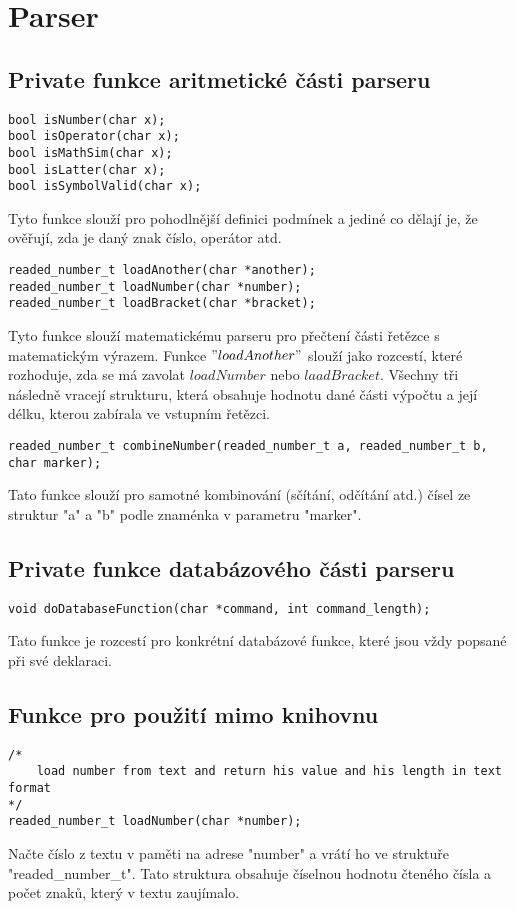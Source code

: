 
\section{Parser} 
\subsection{Private funkce aritmetické části parseru}
\begin{lstlisting}[style=CStyle]
bool isNumber(char x);     
bool isOperator(char x);   
bool isMathSim(char x);    
bool isLatter(char x);     
bool isSymbolValid(char x);
\end{lstlisting}
Tyto funkce slouží pro pohodlnější definici podmínek a jediné co dělají je, že ověřují, zda je daný znak číslo, operátor atd.

\begin{lstlisting}[style=CStyle]
readed_number_t loadAnother(char *another);
readed_number_t loadNumber(char *number);  
readed_number_t loadBracket(char *bracket);
\end{lstlisting}
Tyto funkce slouží matematickému parseru pro přečtení části řetězce s matematickým výrazem.
Funkce \("loadAnother"\) slouží jako rozcestí, které rozhoduje, zda se má zavolat \(loadNumber\) nebo \(laadBracket\).
Všechny tři následně vracejí strukturu, která obsahuje hodnotu dané části výpočtu a její délku, kterou zabírala ve vstupním řetězci.
\\
\begin{lstlisting}[style=CStyle]
readed_number_t combineNumber(readed_number_t a, readed_number_t b, char marker);
\end{lstlisting}
Tato funkce slouží pro samotné kombinování (sčítání, odčítání atd.) čísel ze struktur "a" a "b" podle znaménka v parametru "marker".
\\

\subsection{Private funkce databázového části parseru}
\begin{lstlisting}[style=CStyle]
void doDatabaseFunction(char *command, int command_length);
\end{lstlisting}
Tato funkce je rozcestí pro konkrétní databázové funkce, které jsou vždy popsané při své deklaraci.

\subsection{Funkce pro použití mimo knihovnu}
\begin{lstlisting}[style=CStyle]
/*
    load number from text and return his value and his length in text format
*/
readed_number_t loadNumber(char *number);
\end{lstlisting}
Načte číslo z textu v paměti na adrese "number" a vrátí ho ve struktuře "readed\_number\_t".
Tato struktura obsahuje číselnou hodnotu čteného čísla a počet znaků, který v textu zaujímalo.

